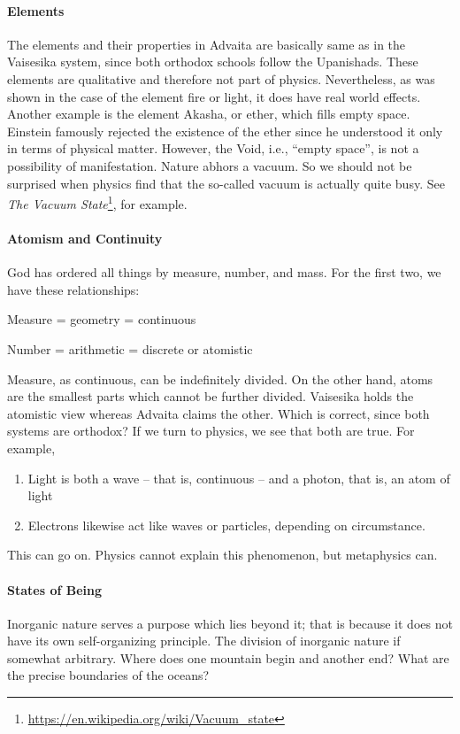 \paragraph{Elements}
The elements and their properties in Advaita are basically same as in the Vaisesika system, since both orthodox schools follow the Upanishads. These elements are qualitative and therefore not part of physics. Nevertheless, as was shown in the case of the element fire or light, it does have real world effects. Another example is the element Akasha, or ether, which fills empty space. Einstein famously rejected the existence of the ether since he understood it only in terms of physical matter. However, the Void, i.e., “empty space”, is not a possibility of manifestation. Nature abhors a vacuum. So we should not be surprised when physics find that the so-called vacuum is actually quite busy. See \textit{The Vacuum State}\footnote{\url{https://en.wikipedia.org/wiki/Vacuum_state}}, for example.

\paragraph{Atomism and Continuity}
God has ordered all things by measure, number, and mass. For the first two, we have these relationships:

Measure = geometry = continuous

Number = arithmetic = discrete or atomistic

Measure, as continuous, can be indefinitely divided. On the other hand, atoms are the smallest parts which cannot be further divided. Vaisesika holds the atomistic view whereas Advaita claims the other. Which is correct, since both systems are orthodox? If we turn to physics, we see that both are true. For example,

\begin{enumerate}
\item Light is both a wave – that is, continuous – and a photon, that is, an atom of light 
\item Electrons likewise act like waves or particles, depending on circumstance. 
\end{enumerate}
This can go on. Physics cannot explain this phenomenon, but metaphysics can.

\paragraph{States of Being}
Inorganic nature serves a purpose which lies beyond it; that is because it does not have its own self-organizing principle. The division of inorganic nature if somewhat arbitrary. Where does one mountain begin and another end? What are the precise boundaries of the oceans?

